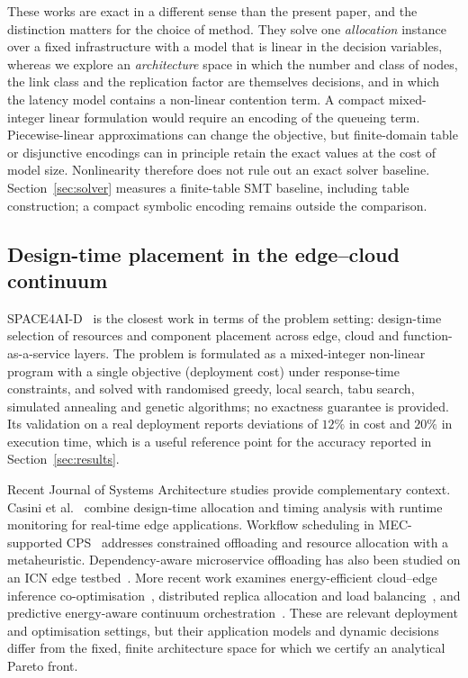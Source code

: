 \documentclass[preprint,11pt,3p]{elsarticle}
\theoremstyle{plain}
\theoremstyle{definition}
\begin{document}
These works are exact in a different sense than the present paper, and the distinction
matters for the choice of method. They solve one \emph{allocation} instance over a fixed
infrastructure with a model that is linear in the decision variables, whereas we explore
an \emph{architecture} space in which the number and class of nodes, the link class and
the replication factor are themselves decisions, and in which the latency model contains
a non-linear contention term. A compact mixed-integer linear formulation would require an encoding of the
queueing term. Piecewise-linear approximations can change the objective, but
finite-domain table or disjunctive encodings can in principle retain the exact
values at the cost of model size. Nonlinearity therefore does not rule out an
exact solver baseline. Section~\ref{sec:solver} measures a finite-table SMT baseline, including table construction; a compact symbolic encoding remains outside the comparison.

\subsection{Design-time placement in the edge--cloud continuum}
SPACE4AI-D~\cite{sedghani2024space4aid} is the closest work in terms of the problem
setting: design-time selection of resources and component placement across edge, cloud
and function-as-a-service layers. The problem is formulated as a mixed-integer
non-linear program with a single objective (deployment cost) under response-time
constraints, and solved with randomised greedy, local search, tabu search, simulated
annealing and genetic algorithms; no exactness guarantee is provided. Its validation on
a real deployment reports deviations of $12\%$ in cost and $20\%$ in execution time,
which is a useful reference point for the accuracy reported in
Section~\ref{sec:results}.

Recent Journal of Systems Architecture studies provide complementary context.
Casini et al.~\cite{casini2025edge} combine design-time allocation and timing analysis
with runtime monitoring for real-time edge applications. Workflow scheduling in
MEC-supported CPS~\cite{gene2024} addresses constrained offloading and resource allocation
with a metaheuristic. Dependency-aware microservice offloading has also been studied
on an ICN edge testbed~\cite{ali2026icn}. More recent work examines energy-efficient
cloud--edge inference co-optimisation~\cite{cloud2026coopt}, distributed replica allocation
and load balancing~\cite{filippini2026replica}, and predictive energy-aware continuum
orchestration~\cite{predictive2026}. These are relevant deployment and optimisation
settings, but their application models and dynamic decisions differ from the fixed,
finite architecture space for which we certify an analytical Pareto front.
\end{document}
